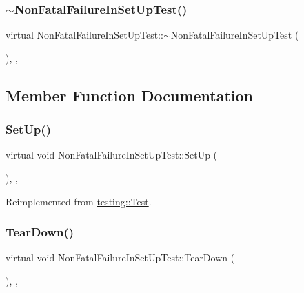 \subsubsection{\texorpdfstring{$\sim$NonFatalFailureInSetUpTest()}{~NonFatalFailureInSetUpTest()}}
{\footnotesize\ttfamily virtual Non\+Fatal\+Failure\+In\+Set\+Up\+Test\+::$\sim$\+Non\+Fatal\+Failure\+In\+Set\+Up\+Test (\begin{DoxyParamCaption}{ }\end{DoxyParamCaption})\hspace{0.3cm}{\ttfamily [inline]}, {\ttfamily [protected]}, {\ttfamily [virtual]}}



\subsection{Member Function Documentation}
\mbox{\label{classNonFatalFailureInSetUpTest_ae24c724bae1fcd2601f58fa9c26adca3}} 
\subsubsection{\texorpdfstring{SetUp()}{SetUp()}}
{\footnotesize\ttfamily virtual void Non\+Fatal\+Failure\+In\+Set\+Up\+Test\+::\+Set\+Up (\begin{DoxyParamCaption}{ }\end{DoxyParamCaption})\hspace{0.3cm}{\ttfamily [inline]}, {\ttfamily [protected]}, {\ttfamily [virtual]}}



Reimplemented from \mbox{\hyperlink{classtesting_1_1Test_a190315150c303ddf801313fd1a777733}{testing\+::\+Test}}.

\mbox{\label{classNonFatalFailureInSetUpTest_a36abc808b11afc6a9bfa20dac5c28c30}} 
\subsubsection{\texorpdfstring{TearDown()}{TearDown()}}
{\footnotesize\ttfamily virtual void Non\+Fatal\+Failure\+In\+Set\+Up\+Test\+::\+Tear\+Down (\begin{DoxyParamCaption}{ }\end{DoxyParamCaption})\hspace{0.3cm}{\ttfamily [inline]}, {\ttfamily [protected]}, {\ttfamily [virtual]}}



